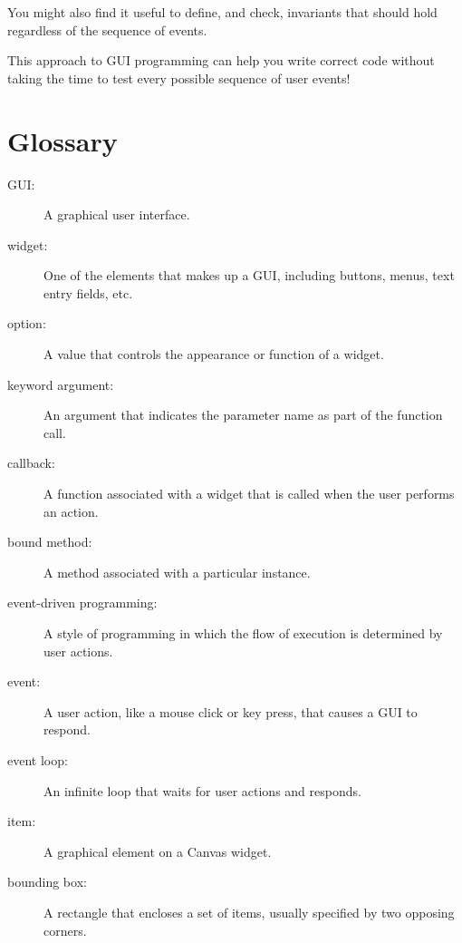 \documentclass[10pt]{book}
\begin{document}
You might also find it useful to define, and check, invariants that
should hold regardless of the sequence of events.


This approach to GUI programming can help you write correct
code without taking the time to test every possible sequence
of user events!


\section{Glossary}

\begin{description}

\item[GUI:] A graphical user interface.

\item[widget:] One of the elements that makes up a GUI, including
buttons, menus, text entry fields, etc. 

\item[option:] A value that controls the appearance or function of
a widget.

\item[keyword argument:] An argument that indicates the parameter
name as part of the function call.

\item[callback:] A function associated with a widget that is
called when the user performs an action.

\item[bound method:] A method associated with a particular instance.

\item[event-driven programming:] A style of programming in which
the flow of execution is determined by user actions.

\item[event:] A user action, like a mouse click or key press, that
causes a GUI to respond.

\item[event loop:] An infinite loop that waits for user actions
and responds.

\item[item:] A graphical element on a Canvas widget.

\item[bounding box:] A rectangle that encloses a set of items,
usually specified by two opposing corners.


\end{description}
\end{document}

